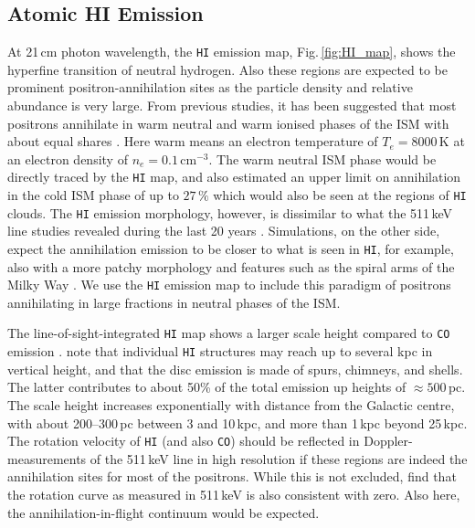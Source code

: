 \documentclass[doublespace,draft,nopageskip]{VTthesis} %
\newcommand{\mrm}[1]{\mathrm{#1}}
\begin{document}
\begin{appendices}
	
	\subsection{Atomic HI Emission}
	
	At 21\,cm photon wavelength, the \texttt{HI} emission map, Fig.\,\ref{fig:HI_map}, shows the hyperfine transition of neutral hydrogen.
	Also these regions are expected to be prominent positron-annihilation sites as the particle density and relative abundance is very large.
	From previous studies, it has been suggested that most positrons annihilate in warm neutral and warm ionised phases of the ISM with about equal shares \citep{Jean2006_511}.
	Here warm means an electron temperature of $T_e = 8000\,\mrm{K}$ at an electron density of $n_e = 0.1\,\mrm{cm^{-3}}$.
	The warm neutral ISM phase would be directly traced by the \texttt{HI} map, and \citet{Jean2006_511} also estimated an upper limit on annihilation in the cold ISM phase of up to $27\,\%$ which would also be seen at the regions of \texttt{HI} clouds.
	The \texttt{HI} emission morphology, however, is dissimilar to what the 511\,keV line studies revealed during the last 20 years \citep{Purcell1997_511,Knoedlseder2005_511,Siegert2016_511,Siegert2019_lv511,Skinner2014_511,Churazov2011_511}.
	Simulations, on the other side, expect the annihilation emission to be closer to what is seen in \texttt{HI}, for example, also with a more patchy morphology and features such as the spiral arms of the Milky Way \citep{Alexis2014_511ISM,Panther2018_pos_transport}.
	We use the \texttt{HI} emission map to include this paradigm of positrons annihilating in large fractions in neutral phases of the ISM. 
	
	The line-of-sight-integrated \texttt{HI} map shows a larger scale height compared to \texttt{CO} emission \citep{Dickey1990_HI}.
	\citet{Kalberla2009_HI} note that individual \texttt{HI} structures may reach up to several kpc in vertical height, and that the disc emission is made of spurs, chimneys, and shells.
	The latter contributes to about 50\% of the total emission up heights of $\approx 500$\,pc.
	The scale height increases exponentially with distance from the Galactic centre, with about 200--300\,pc between 3 and 10\,kpc, and more than 1\,kpc beyond 25\,kpc.
	The rotation velocity of \texttt{HI} (and also \texttt{CO}) should be reflected in Doppler-measurements of the 511\,keV line in high resolution if these regions are indeed the annihilation sites for most of the positrons.
	While this is not excluded, \citet{Siegert2019_lv511} find that the rotation curve as measured in 511\,keV is also consistent with zero.
	Also here, the annihilation-in-flight continuum would be expected.
	

\end{appendices}
\end{document}
